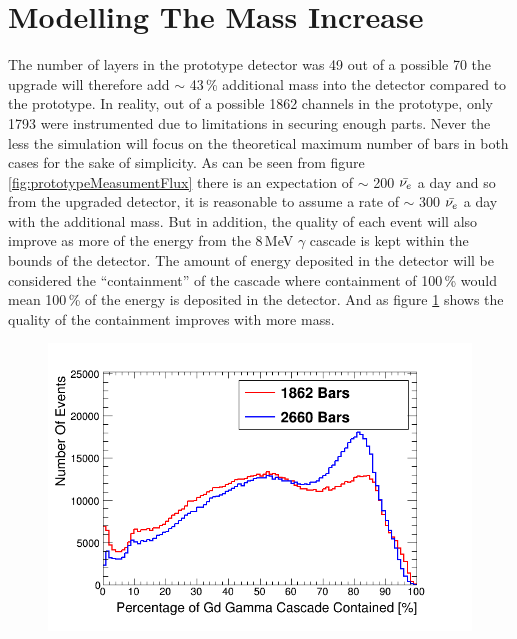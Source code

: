 \section{Modelling The Mass Increase}
The number of layers in the prototype detector was 49 out of a possible 70 the upgrade will therefore add $\sim$ 43\,\% additional mass into the detector compared to the prototype. In reality, out of a possible 1862 channels in the prototype, only 1793 were instrumented due to limitations in securing enough parts. Never the less the simulation will focus on the theoretical maximum number of bars in both cases for the sake of simplicity. As can be seen from figure \ref{fig:prototypeMeasumentFlux} there is an expectation of $\sim$ 200 $\Bar{\nu_e}$ a day and so from the upgraded detector, it is reasonable to assume a rate of $\sim$ 300 $\Bar{\nu_e}$ a day with the additional mass. But in addition, the quality of each event will also improve as more of the energy from the 8\,MeV $\gamma$ cascade is kept within the bounds of the detector. The amount of energy deposited in the detector will be considered the ``containment'' of the cascade where containment of 100\,\% would mean 100\,\% of the energy is deposited in the detector. And as figure \ref{fig:containment_comparison} shows the quality of the containment improves with more mass. %

\begin{figure}[!h]
 \centering
 \includegraphics[width=0.7\linewidth]{Chapter4/Figs/cascadeContainmentCompare.png}
 \label{fig:containment_comparison}
\end{figure} 

